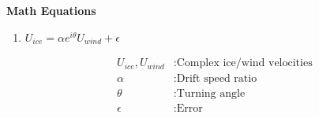 \documentclass[12pt]{article}
\begin{document}
\begin{center}
{\bf Math Equations} 
\end{center}
\vspace{0.2cm}

\begin{enumerate}
    \item $U_{ice} = \alpha e^{i\theta}U_{wind} + \epsilon$

    \begin{align}
        U_{ice}, U_{wind} &: \text{Complex ice/wind velocities} \\
        \alpha &: \text{Drift speed ratio}\\
        \theta &: \text{Turning angle} \\
        \epsilon &: \text{Error}
    \end{align}

\end{enumerate}
\end{document}
